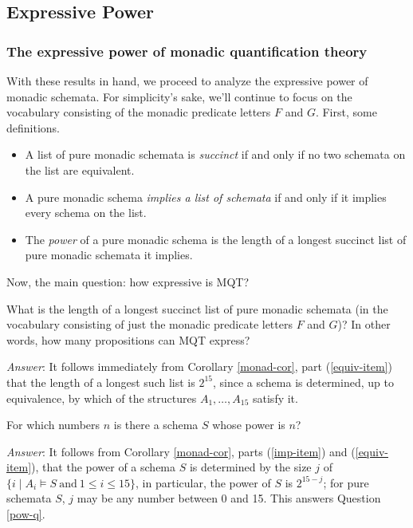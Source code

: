 \subsection{Expressive Power}

\subsubsection*{The expressive power of monadic quantification theory}

With these results in hand, we proceed to analyze the expressive power of monadic schemata. For simplicity's sake, we'll continue to focus on the vocabulary consisting of the monadic predicate letters $F$ and $G$. First, some definitions. 
\begin{itemize}
\item 
A list of pure monadic schemata is \textit{succinct} if and only if no two schemata on the list are equivalent. 
\item 
A pure monadic schema \textit{implies a list of schemata} if and only if it implies every schema on the list.
\item The \textit{power} of a pure monadic schema is the length of a longest succinct list of pure monadic schemata it implies.  
\end{itemize}

Now, the main question: how expressive is MQT?

\begin{question}\label{succinct-q}
What is the length of a longest succinct list of pure monadic schemata (in the vocabulary consisting of just the monadic predicate letters $F$ and $G$)? In other words, how many propositions can MQT express?
\end{question}
\emph{Answer}:
It follows immediately from Corollary \ref{monad-cor}, part (\ref{equiv-item}) that the length of a longest such list is $2^{15}$, since a schema is determined, up to equivalence, by which of the structures $A_1,\ldots,A_{15}$ satisfy it. 
\begin{question}\label{pow-q}
For which numbers $n$ is there a schema $S$ whose power is $n$?
\end{question}
\emph{Answer}:
It follows from Corollary \ref{monad-cor}, parts (\ref{imp-item}) and (\ref{equiv-item}), that the power of a schema $S$ is determined by the size $j$ of $\{i\mid A_i\models S\ \mbox{and}\ 1\leq i\leq 15\}$, in particular, the power of $S$ is $2^{15-j}$; for pure schemata $S$, $j$ may be any number between 0 and 15. This answers Question \ref{pow-q}.

